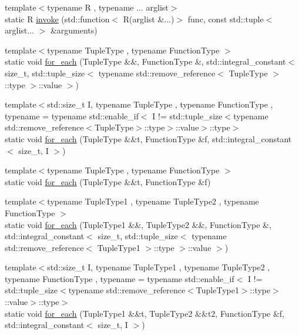 \begin{DoxyCompactItemize}
\item 
{\footnotesize template$<$typename R , typename ... arglist$>$ }\\static R \mbox{\hyperlink{structfakeit_1_1TupleDispatcher_a279619fd6d6649c4d99c459a3286469a}{invoke}} (std\+::function$<$ R(arglist \&...)$>$ func, const std\+::tuple$<$ arglist... $>$ \&arguments)
\item 
{\footnotesize template$<$typename Tuple\+Type , typename Function\+Type $>$ }\\static void \mbox{\hyperlink{structfakeit_1_1TupleDispatcher_af22c1fae8c695f722da986df9af411ca}{for\+\_\+each}} (Tuple\+Type \&\&, Function\+Type \&, std\+::integral\+\_\+constant$<$ size\+\_\+t, std\+::tuple\+\_\+size$<$ typename std\+::remove\+\_\+reference$<$ Tuple\+Type $>$\+::type $>$\+::value $>$)
\item 
{\footnotesize template$<$std\+::size\+\_\+t I, typename Tuple\+Type , typename Function\+Type , typename  = typename std\+::enable\+\_\+if$<$            I != std\+::tuple\+\_\+size$<$typename std\+::remove\+\_\+reference$<$\+Tuple\+Type$>$\+::type$>$\+::value$>$\+::type$>$ }\\static void \mbox{\hyperlink{structfakeit_1_1TupleDispatcher_afd32e025fbf695e16bb4b4ac1642c491}{for\+\_\+each}} (Tuple\+Type \&\&t, Function\+Type \&f, std\+::integral\+\_\+constant$<$ size\+\_\+t, I $>$)
\item 
{\footnotesize template$<$typename Tuple\+Type , typename Function\+Type $>$ }\\static void \mbox{\hyperlink{structfakeit_1_1TupleDispatcher_a8fd292a71795aae0aba215dad28ee4c2}{for\+\_\+each}} (Tuple\+Type \&\&t, Function\+Type \&f)
\item 
{\footnotesize template$<$typename Tuple\+Type1 , typename Tuple\+Type2 , typename Function\+Type $>$ }\\static void \mbox{\hyperlink{structfakeit_1_1TupleDispatcher_a30fb1a59df83f4faaa461d3fee4b20bc}{for\+\_\+each}} (Tuple\+Type1 \&\&, Tuple\+Type2 \&\&, Function\+Type \&, std\+::integral\+\_\+constant$<$ size\+\_\+t, std\+::tuple\+\_\+size$<$ typename std\+::remove\+\_\+reference$<$ Tuple\+Type1 $>$\+::type $>$\+::value $>$)
\item 
{\footnotesize template$<$std\+::size\+\_\+t I, typename Tuple\+Type1 , typename Tuple\+Type2 , typename Function\+Type , typename  = typename std\+::enable\+\_\+if$<$            I != std\+::tuple\+\_\+size$<$typename std\+::remove\+\_\+reference$<$\+Tuple\+Type1$>$\+::type$>$\+::value$>$\+::type$>$ }\\static void \mbox{\hyperlink{structfakeit_1_1TupleDispatcher_a42566b7faaac776dc99492e7c0b973b3}{for\+\_\+each}} (Tuple\+Type1 \&\&t, Tuple\+Type2 \&\&t2, Function\+Type \&f, std\+::integral\+\_\+constant$<$ size\+\_\+t, I $>$)

\end{DoxyCompactItemize}
